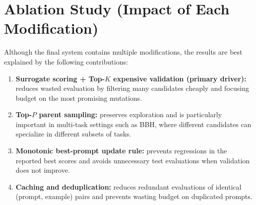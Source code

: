 \begin{table}[H]
\centering
\small
\caption{Comparison between Original GEPA and SGPO (\textit{SciEval}).}
\label{tab:scieval}
\end{table}

\section{Ablation Study (Impact of Each Modification)}
Although the final system contains multiple modifications, the results are best explained by the following contributions:
\begin{enumerate}
    \item \textbf{Surrogate scoring + Top-$K$ expensive validation (primary driver):} reduces wasted evaluation by filtering many candidates cheaply and focusing budget on the most promising mutations.
    \item \textbf{Top-$P$ parent sampling:} preserves exploration and is particularly important in multi-task settings such as BBH, where different candidates can specialize in different subsets of tasks.
    \item \textbf{Monotonic best-prompt update rule:} prevents regressions in the reported best scores and avoids unnecessary test evaluations when validation does not improve.
    \item \textbf{Caching and deduplication:} reduces redundant evaluations of identical (prompt, example) pairs and prevents wasting budget on duplicated prompts.
\end{enumerate}

